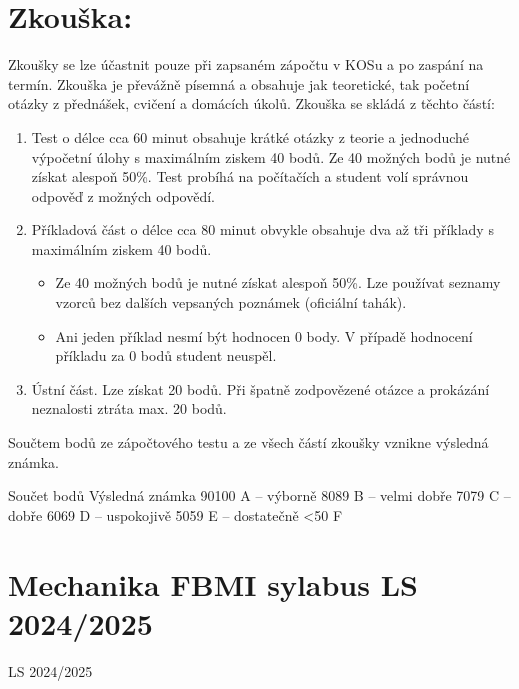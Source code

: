 \documentclass[letterpaper,10pt,english]{jupyterBook}
\begin{document}
\chapter{Zkouška:}
\label{\detokenize{Misc/Podm_xednky_z_xe1po_u010dtu_a_zkou_u0161ky:zkouska}}
\sphinxAtStartPar
Zkoušky se lze účastnit pouze při zapsaném zápočtu v KOSu a po zaspání na termín. Zkouška je převážně písemná a obsahuje
jak teoretické, tak početní otázky z přednášek, cvičení a domácích úkolů. Zkouška se skládá z těchto
částí:
\begin{enumerate}
%
\item {} 
\sphinxAtStartPar
Test o délce cca 60 minut obsahuje krátké otázky z teorie a jednoduché výpočetní úlohy
s maximálním ziskem 40 bodů. Ze 40 možných bodů je nutné získat alespoň 50\%. Test probíhá na počítačích a student volí správnou odpověď z možných odpovědí.

\item {} 
\sphinxAtStartPar
Příkladová část o délce cca 80 minut obvykle obsahuje dva až tři příklady s maximálním ziskem 40 bodů.
\begin{itemize}
\item {} 
\sphinxAtStartPar
Ze 40 možných bodů je nutné získat alespoň 50\%. Lze používat seznamy vzorců bez dalších vepsaných poznámek (oficiální tahák).

\item {} 
\sphinxAtStartPar
Ani jeden příklad nesmí být hodnocen 0 body. V případě hodnocení příkladu za 0 bodů student neuspěl.

\end{itemize}

\item {} 
\sphinxAtStartPar
Ústní část. Lze získat 20 bodů. Při špatně zodpovězené otázce a prokázání neznalosti ztráta max. 20 bodů.

\end{enumerate}

\sphinxAtStartPar
Součtem bodů ze zápočtového testu a ze všech částí zkoušky vznikne výsledná známka.

\sphinxAtStartPar
Součet bodů Výsledná známka
90\sphinxhyphen{}100 A – výborně
80\sphinxhyphen{}89 B – velmi dobře
70\sphinxhyphen{}79 C – dobře
60\sphinxhyphen{}69 D – uspokojivě
50\sphinxhyphen{}59 E – dostatečně
<50 F

\sphinxstepscope


\chapter{Mechanika FBMI sylabus LS 2024/2025}
\label{\detokenize{Misc/Sylabus_LS2025:mechanika-fbmi-sylabus-ls-2024-2025}}\label{\detokenize{Misc/Sylabus_LS2025::doc}}
\sphinxAtStartPar
LS 2024/2025
\end{document}
